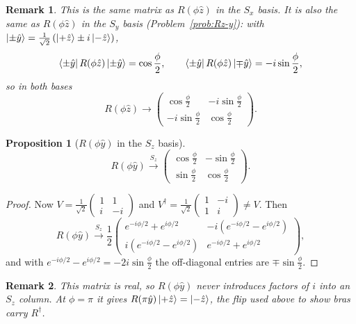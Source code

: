 \documentclass{article}
\newtheorem{remark}{Remark}
\newtheorem{proposition}{Proposition}
\begin{document}
\begin{remark}
    This is the same matrix as $R(\phi\hat{z})$ in the $S_x$ basis. It is also the same as $R(\phi\hat{z})$ in the $S_y$ basis (Problem~\ref{prob:Rz-y}): with $\ket{\pm\hat{y}} = \frac{1}{\sqrt{2}}\left(\ket{+\hat{z}} \pm i\ket{-\hat{z}}\right)$,
    \[\bra{\pm\hat{y}}R(\phi\hat{z})\ket{\pm\hat{y}} = \cos\frac{\phi}{2}, \qquad \bra{\pm\hat{y}}R(\phi\hat{z})\ket{\mp\hat{y}} = -i\sin\frac{\phi}{2},\]
    so in both bases
    \[R(\phi\hat{z}) \longrightarrow \begin{pmatrix} \cos\frac{\phi}{2} & -i\sin\frac{\phi}{2} \\ -i\sin\frac{\phi}{2} & \cos\frac{\phi}{2} \end{pmatrix}.\]
\end{remark}
\begin{proposition}[$R(\phi\hat{y})$ in the $S_z$ basis]
    \begin{equation}
        R(\phi\hat{y}) \xrightarrow{S_z} \begin{pmatrix} \cos\frac{\phi}{2} & -\sin\frac{\phi}{2} \\ \sin\frac{\phi}{2} & \cos\frac{\phi}{2} \end{pmatrix}.
    \end{equation}
\end{proposition}
\begin{proof}
    Now $V = \frac{1}{\sqrt{2}}\begin{pmatrix} 1 & 1 \\ i & -i \end{pmatrix}$ and $V^\dagger = \frac{1}{\sqrt{2}}\begin{pmatrix} 1 & -i \\ 1 & i \end{pmatrix} \neq V$. Then
    \[R(\phi\hat{y}) \xrightarrow{S_z} \frac{1}{2}\begin{pmatrix} e^{-i\phi/2} + e^{i\phi/2} & -i\left(e^{-i\phi/2} - e^{i\phi/2}\right) \\ i\left(e^{-i\phi/2} - e^{i\phi/2}\right) & e^{-i\phi/2} + e^{i\phi/2} \end{pmatrix},\]
    and with $e^{-i\phi/2} - e^{i\phi/2} = -2i\sin\frac{\phi}{2}$ the off-diagonal entries are $\mp\sin\frac{\phi}{2}$.
\end{proof}
\begin{remark}
    This matrix is real, so $R(\phi\hat{y})$ never introduces factors of $i$ into an $S_z$ column. At $\phi = \pi$ it gives $R(\pi\hat{y})\ket{+\hat{z}} = \ket{-\hat{z}}$, the flip used above to show bras carry $R^\dagger$.
\end{remark}
\end{document}

